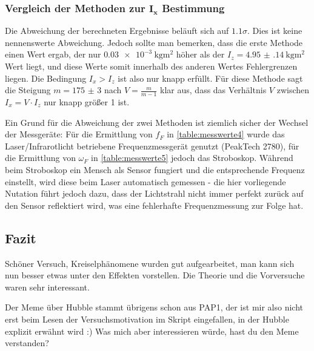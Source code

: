 \subsubsection[\texorpdfstring{Vergleich der Methoden zur \(I_x\) Bestimmung}{Vergleich der Methoden zur I x Bestimmung}]{Vergleich der Methoden zur \(\boldsymbol{I_x}\) Bestimmung}
Die Abweichung der berechneten Ergebnisse beläuft sich auf \(\num{1.1}\sigma\). Dies ist keine nennenswerte Abweichung. Jedoch sollte man bemerken, dass die erste Methode einen Wert ergab, der nur \(\qty{0.03e-3}{\kg\m\squared}\) höher als der \(I_z=\qty{4.95(14)}{\kg\m\squared}\) Wert liegt, und diese Werte somit innerhalb des anderen Wertes Fehlergrenzen liegen. Die Bedingung \(I_x>I_z\) ist also nur knapp erfüllt. Für diese Methode sagt die Steigung \(m=\num{175(3)}\) nach \(V=\frac{m}{m-1}\) klar aus, dass das Verhältnis \(V\) zwischen \(I_x=V\cdot I_z\) nur knapp größer 1 ist. 

Ein Grund für die Abweichung der zwei Methoden ist ziemlich sicher der Wechsel der Messgeräte: Für die Ermittlung von \(f_F\) in \cref{table:messwerte4} wurde das Laser/Infrarotlicht betriebene Frequenzmessgerät genutzt (PeakTech 2780), für die Ermittlung von \(\omega_F\) in \cref{table:messwerte5} jedoch das Stroboskop. Während beim Stroboskop ein Mensch als Sensor fungiert und die entsprechende Frequenz einstellt, wird diese beim Laser automatisch gemessen - die hier vorliegende Nutation führt jedoch dazu, dass der Lichtstrahl nicht immer perfekt zurück auf den Sensor reflektiert wird, was eine fehlerhafte Frequenzmessung zur Folge hat. 

\subsection{Fazit}
Schöner Versuch, Kreiselphänomene wurden gut aufgearbeitet, man kann sich nun besser etwas unter den Effekten vorstellen. Die Theorie und die Vorversuche waren sehr interessant.  

Der Meme über Hubble stammt übrigens schon aus PAP1, der ist mir also nicht erst beim Lesen der Versuchsmotivation im Skript eingefallen, in der Hubble explizit erwähnt wird :)
Was mich aber interessieren würde, hast du den Meme verstanden?
